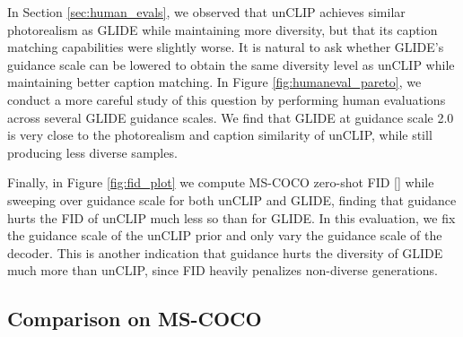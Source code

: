 \documentclass{article}
\newcommand{\shortcite}[1]{[\citenum{#1}]}
\newcommand{\modelname}{unCLIP}
\begin{document}
In Section \ref{sec:human_evals}, we observed that \modelname{} achieves similar photorealism as GLIDE while maintaining more diversity, but that its caption matching capabilities were slightly worse. It is natural to ask whether GLIDE's guidance scale can be lowered to obtain the same diversity level as \modelname{} while maintaining better caption matching. In Figure \ref{fig:humaneval_pareto}, we conduct a more careful study of this question by performing human evaluations across several GLIDE guidance scales. We find that GLIDE at guidance scale 2.0 is very close to the photorealism and caption similarity of \modelname{}, while still producing less diverse samples.

Finally, in Figure \ref{fig:fid_plot} we compute MS-COCO zero-shot FID \shortcite{fid} while sweeping over guidance scale for both \modelname{} and GLIDE, finding that guidance hurts the FID of \modelname{} much less so than for GLIDE. In this evaluation, we fix the guidance scale of the \modelname{} prior and only vary the guidance scale of the decoder. This is another indication that guidance hurts the diversity of GLIDE much more than \modelname{}, since FID heavily penalizes non-diverse generations.

\subsection{Comparison on MS-COCO}
\label{sec:fid}
\end{document}
